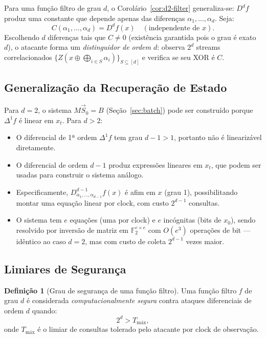 \documentclass[12pt,a4paper]{article}
\theoremstyle{definition}
\newtheorem{definition}[theorem]{Definição}
\theoremstyle{remark}
\newcommand{\GFtwo}{\mathbb{F}_2}
\newcommand{\xor}{\oplus}
\newcommand{\filter}{f}
\begin{document}
Para uma função filtro de grau $d$, o Corolário~\ref{cor:d2-filter}
generaliza-se: $D^d f$ produz uma constante que depende apenas das
diferenças $\alpha_1, \ldots, \alpha_d$. Seja:
\[
  C(\alpha_1,\ldots,\alpha_d) = D^d f(x) \quad (\text{independente de } x).
\]
Escolhendo $d$ diferenças tais que $C \neq 0$ (existência garantida pois
o grau é exato $d$), o atacante forma um \emph{distinguidor de ordem $d$}:
observa $2^d$ streams correlacionados $\{Z(x \xor \bigoplus_{i \in S}
\alpha_i)\}_{S \subseteq [d]}$ e verifica se seu XOR é $C$.

\subsection{Generalização da Recuperação de Estado}

Para $d = 2$, o sistema $M \vec{S}_0 = B$ (Seção~\ref{sec:batch}) pode
ser construído porque $\Delta^1 \filter$ é linear em $x_t$. Para $d > 2$:

\begin{itemize}
  \item O diferencial de 1ª ordem $\Delta^1 f$ tem grau $d-1 > 1$, portanto
        não é linearizável diretamente.
  \item O diferencial de ordem $d-1$ produz expressões lineares em $x_t$,
        que podem ser usadas para construir o sistema análogo.
  \item Especificamente, $D^{d-1}_{\alpha_1,\ldots,\alpha_{d-1}} f(x)$ é
        afim em $x$ (grau 1), possibilitando montar uma equação linear por
        clock, com custo $2^{d-1}$ consultas.
  \item O sistema tem $e$ equações (uma por clock) e $e$ incógnitas (bits
        de $x_0$), sendo resolvido por inversão de matriz em $\GFtwo^{e \times e}$
        com $O(e^3)$ operações de bit — idêntico ao caso $d=2$, mas com
        custo de coleta $2^{d-1}$ vezes maior.
\end{itemize}

\subsection{Limiares de Segurança}

\begin{definition}[Grau de segurança de uma função filtro]
  Uma função filtro $\filter$ de grau $d$ é considerada \emph{computacionalmente
  segura} contra ataques diferenciais de ordem $d$ quando:
  \[
    2^d > T_{\text{máx}},
  \]
  onde $T_{\text{máx}}$ é o limiar de consultas tolerado pelo atacante
  por clock de observação.
\end{definition}
\end{document}

